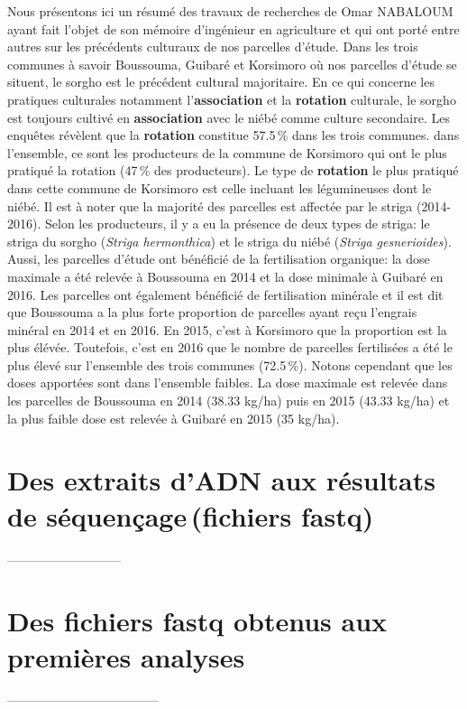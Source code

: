 \documentclass[a4paper,11pt]{article}
\begin{document}
Nous présentons ici un résumé des travaux de recherches de Omar NABALOUM
ayant fait l'objet de son mémoire d'ingénieur en agriculture et qui ont
porté entre autres sur les précédents culturaux de nos parcelles
d'étude.  Dans les trois communes à savoir Boussouma, Guibaré et
Korsimoro où nos parcelles d'étude se situent, le sorgho est le
précédent cultural majoritaire.  En ce qui concerne les pratiques
culturales notamment l'\textbf{association} et la \textbf{rotation}
culturale, le sorgho est toujours cultivé en \textbf{association} avec
le niébé comme culture secondaire.  Les enquêtes révèlent que la
\textbf{rotation} constitue 57.5\,\% dans les trois communes. dans
l'ensemble, ce sont les producteurs de la commune de Korsimoro qui ont
le plus pratiqué la rotation (47\,\% des producteurs). Le type de
\textbf{rotation} le plus pratiqué dans cette commune de Korsimoro est
celle incluant les légumineuses dont le niébé.  Il est à noter que la
majorité des parcelles est affectée par le striga (2014-2016). Selon
les producteurs, il y a eu la présence de deux types de striga: le
striga du sorgho (\emph{Striga hermonthica}) et le striga du niébé
(\emph{Striga gesnerioides}). Aussi, les parcelles d'étude ont
bénéficié de la fertilisation organique: la dose maximale a été
relevée à Boussouma en 2014 et la dose minimale à Guibaré en 2016. Les
parcelles ont également bénéficié de fertilisation minérale et il est
dit que Boussouma a la plus forte proportion de parcelles ayant reçu
l'engrais minéral en 2014 et en 2016. En 2015, c'est à Korsimoro que
la proportion est la plus élévée. Toutefois, c'est en 2016 que le
nombre de parcelles fertilisées a été le plus élevé sur l'ensemble des
trois communes (72.5\,\%).  Notons cependant que les doses apportées
sont dans l'ensemble faibles. La dose maximale est relevée dans les
parcelles de Boussouma en 2014 (38.33 kg/ha) puis en 2015 (43.33
kg/ha) et la plus faible dose est relevée à Guibaré en 2015 (35
kg/ha).

\section{Des extraits d'ADN aux résultats de séquençage\,(fichiers fastq)}
 ---------------------------
\section{Des fichiers fastq obtenus aux premières analyses}
------------------------------------ 

\end{document}
